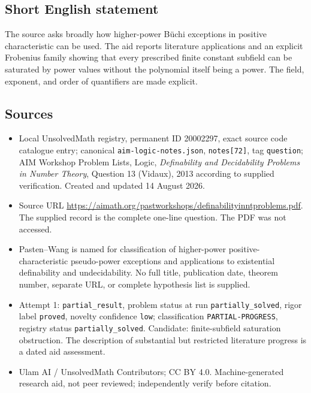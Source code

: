 \documentclass[11pt]{article}
\begin{document}
\subsection{Short English statement}
The source asks broadly how higher-power Büchi exceptions in positive characteristic can be used. The aid reports literature applications and an explicit Frobenius family showing that every prescribed finite constant subfield can be saturated by power values without the polynomial itself being a power. The field, exponent, and order of quantifiers are made explicit.
\subsection{Sources}
\begin{itemize}
\item Local UnsolvedMath registry, permanent ID 20002297, exact source code catalogue entry; canonical \texttt{aim-logic-notes.json}, \texttt{notes[72]}, tag \texttt{question}; AIM Workshop Problem Lists, Logic, \emph{Definability and Decidability Problems in Number Theory}, Question 13 (Vidaux), 2013 according to supplied verification. Created and updated 14 August 2026.
\item Source URL \url{https://aimath.org/pastworkshops/definabilityinntproblems.pdf}. The supplied record is the complete one-line question. The PDF was not accessed.
\item Pasten--Wang is named for classification of higher-power positive-characteristic pseudo-power exceptions and applications to existential definability and undecidability. No full title, publication date, theorem number, separate URL, or complete hypothesis list is supplied.
\item Attempt 1: \texttt{partial\_result}, problem status at run \texttt{partially\_solved}, rigor label \texttt{proved}, novelty confidence \texttt{low}; classification \texttt{PARTIAL-PROGRESS}, registry status \texttt{partially\_solved}. Candidate: finite-subfield saturation obstruction. The description of substantial but restricted literature progress is a dated aid assessment.
\item Ulam AI / UnsolvedMath Contributors; CC BY 4.0. Machine-generated research aid, not peer reviewed; independently verify before citation.
\end{itemize}
\end{document}
